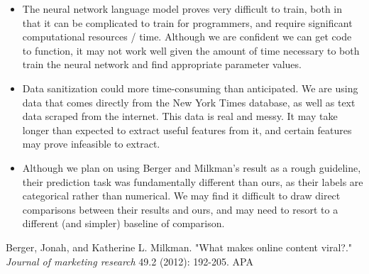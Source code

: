\documentclass[10pt]{article}
\begin{document}
\begin{itemize}
\item The neural network language model proves very difficult to train, both in that it can be complicated to train for programmers, and require significant computational resources / time. Although we are confident we can get code to function, it may not work well given the amount of time necessary to both train the neural network and find appropriate parameter values.
\item Data sanitization could more time-consuming than anticipated. We are using data that comes directly from the New York Times database, as well as text data scraped from the internet. This data is real and messy. It may take longer than expected to extract useful features from it, and certain features may prove infeasible to extract.
\item Although we plan on using Berger and Milkman's result as a rough guideline, their prediction task was fundamentally different than ours, as their labels are categorical rather than numerical. We may find it difficult to draw direct comparisons between their results and ours, and may need to resort to a different (and simpler) baseline of comparison.
\end{itemize}

 \begin{thebibliography}{1}
 
  Berger, Jonah, and Katherine L. Milkman. "What makes online content viral?." {\em Journal of marketing research} 49.2 (2012): 192-205.
APA	
 
 \end{thebibliography} 


	
\end{document}
